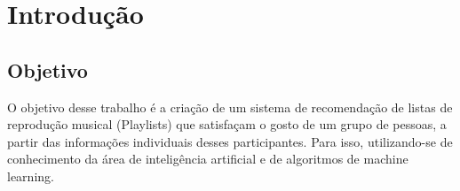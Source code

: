 \documentclass[
	12pt,				%
    oneside,			%
	a4paper,			%
	english,			%
	french,				%
	spanish,			%
	brazil,				%
	]{abntex2}
\begin{document}


\tableofcontents*


\textual


\chapter{Introdução}

\section{Objetivo}
O objetivo desse trabalho é a criação de um sistema de recomendação de listas de reprodução musical (Playlists) que satisfaçam o gosto de um grupo de pessoas, a partir das informações individuais desses participantes. Para isso, utilizando-se de conhecimento da área de inteligência artificial e de algoritmos de machine learning.
\end{document}
